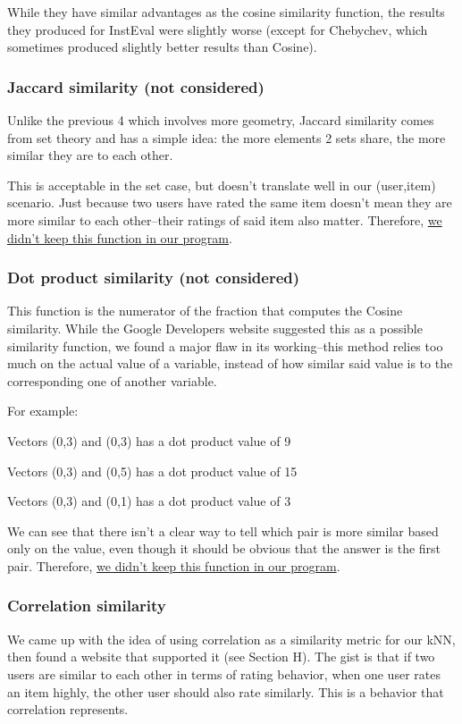 \documentclass{article}
\begin{document}
While they have similar advantages as the cosine similarity function, the results they produced for InstEval were slightly worse (except for Chebychev, which sometimes produced slightly better results than Cosine).

\subsubsection{Jaccard similarity (not considered)}

Unlike the previous 4 which involves more geometry, Jaccard similarity comes from set theory and has a simple idea: the more elements 2 sets share, the more similar they are to each other. 

This is acceptable in the set case, but doesn't translate well in our (user,item) scenario. Just because two users have rated the same item doesn't mean they are more similar to each other--their ratings of said item also matter. Therefore, \underline{we didn't keep this function in our program}.

\subsubsection{Dot product similarity (not considered)}

This function is the numerator of the fraction that computes the Cosine similarity. While the Google Developers website suggested this as a possible similarity function, we found a major flaw in its working--this method relies too much on the actual value of a variable, instead of how similar said value is to the corresponding one of another variable. 

For example:

Vectors (0,3) and (0,3) has a dot product value of 9

Vectors (0,3) and (0,5) has a dot product value of 15

Vectors (0,3) and (0,1) has a dot product value of 3

We can see that there isn't a clear way to tell which pair is more similar based only on the value, even though it should be obvious that the answer is the first pair. Therefore, \underline{we didn't keep this function in our program}.

\subsubsection{Correlation similarity}

We came up with the idea of using correlation as a similarity metric for our kNN, then found a website that supported it (see Section H). The gist is that if two users are similar to each other in terms of rating behavior, when one user rates an item highly, the other user should also rate similarly. This is a behavior that correlation represents. 
\end{document}

